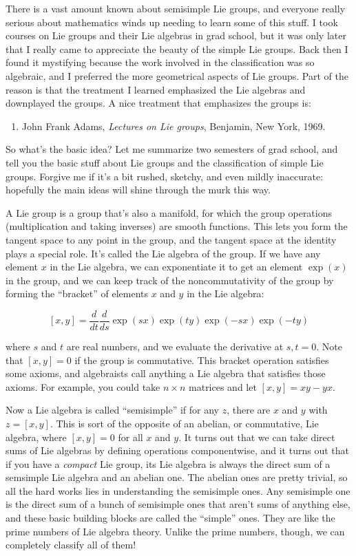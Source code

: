 \documentclass{article}
\def\tightlist{}
\begin{document}
There is a vast amount known about semisimple Lie groups, and everyone
really serious about mathematics winds up needing to learn some of this
stuff. I took courses on Lie groups and their Lie algebras in grad
school, but it was only later that I really came to appreciate the
beauty of the simple Lie groups. Back then I found it mystifying because
the work involved in the classification was so algebraic, and I
preferred the more geometrical aspects of Lie groups. Part of the reason
is that the treatment I learned emphasized the Lie algebras and
downplayed the groups. A nice treatment that emphasizes the groups is:

\begin{enumerate}
\def\labelenumi{\arabic{enumi})}
\setcounter{enumi}{1}
\tightlist
\item
  John Frank Adams, \emph{Lectures on Lie groups}, Benjamin, New York,
  1969.
\end{enumerate}

So what's the basic idea? Let me summarize two semesters of grad school,
and tell you the basic stuff about Lie groups and the classification of
simple Lie groups. Forgive me if it's a bit rushed, sketchy, and even
mildly inaccurate: hopefully the main ideas will shine through the murk
this way.

A Lie group is a group that's also a manifold, for which the group
operations (multiplication and taking inverses) are smooth functions.
This lets you form the tangent space to any point in the group, and the
tangent space at the identity plays a special role. It's called the Lie
algebra of the group. If we have any element \(x\) in the Lie algebra,
we can exponentiate it to get an element \(\exp(x)\) in the group, and
we can keep track of the noncommutativity of the group by forming the
``bracket'' of elements \(x\) and \(y\) in the Lie algebra:

\[[x,y] = \frac{d}{dt}\frac{d}{ds} \exp(sx) \exp(ty) \exp(-sx) \exp(-ty)\]

where \(s\) and \(t\) are real numbers, and we evaluate the derivative
at \(s,t = 0\). Note that \([x,y] = 0\) if the group is commutative.
This bracket operation satisfies some axioms, and algebraists call
anything a Lie algebra that satisfies those axioms. For example, you
could take \(n \times n\) matrices and let \([x,y] = xy - yx\).

Now a Lie algebra is called ``semisimple'' if for any \(z\), there are
\(x\) and \(y\) with \(z = [x,y]\). This is sort of the opposite of an
abelian, or commutative, Lie algebra, where \([x,y] = 0\) for all \(x\)
and \(y\). It turns out that we can take direct sums of Lie algebras by
defining operations componentwise, and it turns out that if you have a
\emph{compact} Lie group, its Lie algebra is always the direct sum of a
semsimple Lie algebra and an abelian one. The abelian ones are pretty
trivial, so all the hard works lies in understanding the semisimple
ones. Any semisimple one is the direct sum of a bunch of semisimple ones
that aren't sums of anything else, and these basic building blocks are
called the ``simple'' ones. They are like the prime numbers of Lie
algebra theory. Unlike the prime numbers, though, we can completely
classify all of them!
\end{document}
